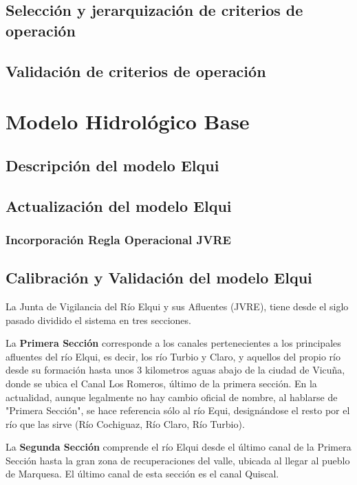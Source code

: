 \documentclass[10pt,]{article}
\begin{document}
		
		\subsection{Selección y jerarquización de criterios de operación}
		\subsection{Validación de criterios de operación}\bigskip

\section{Modelo Hidrológico Base}\bigskip

		\subsection{Descripción del modelo Elqui}
		\subsection{Actualización del modelo Elqui}\bigskip
		
			\subsubsection{Incorporación Regla Operacional JVRE}\bigskip
			
		\subsection{Calibración y Validación del modelo Elqui}
		

La Junta de Vigilancia del Río Elqui y sus Afluentes (JVRE), tiene desde el siglo pasado dividido el sistema en tres secciones.\bigskip

La \textbf {Primera Sección} corresponde a los canales pertenecientes a los principales afluentes del río Elqui, es decir, los río Turbio y Claro, y aquellos del propio río desde su formación hasta unos 3 kilometros aguas abajo de la ciudad de Vicuña, donde se ubica el Canal Los Romeros, último de la primera sección. En la actualidad, aunque legalmente no hay cambio oficial de nombre, al hablarse de "Primera Sección", se hace referencia sólo al río Equi, designándose el resto por el río que las sirve (Río Cochiguaz, Río Claro, Río Turbio).\bigskip

La \textbf {Segunda Sección} comprende el río Elqui desde el último canal de la Primera Sección hasta la gran zona de recuperaciones del valle, ubicada al llegar al pueblo de Marquesa. El último canal de esta sección es el canal Quiscal.\bigskip
\end{document}
